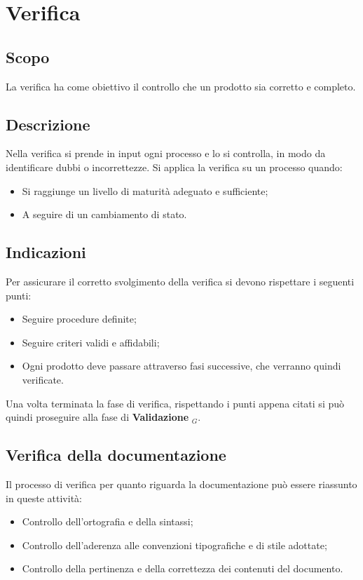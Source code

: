 \section{Verifica}
\subsection{Scopo}
La verifica ha come obiettivo il controllo che un prodotto sia corretto e completo.

\subsection{Descrizione}
Nella verifica si prende in input ogni processo e lo si controlla, in modo da identificare dubbi o incorrettezze.
Si applica la verifica su un processo quando:
\begin{itemize}
  \item Si raggiunge un livello di maturità adeguato e sufficiente;
  \item A seguire di un cambiamento di stato.
\end{itemize}

\subsection{Indicazioni}
Per assicurare il corretto svolgimento della verifica si devono rispettare i seguenti punti:
\begin{itemize}
  \item Seguire procedure definite;
  \item Seguire criteri validi e affidabili;
  \item Ogni prodotto deve passare attraverso fasi successive, che verranno quindi verificate.
\end{itemize}
Una volta terminata la fase di verifica, rispettando i punti appena citati si può quindi proseguire alla fase di \textbf{Validazione} $_G$.

\subsection{Verifica della documentazione}
Il processo di verifica per quanto riguarda la documentazione può essere riassunto in queste attività:
\begin{itemize}
  \item Controllo dell'ortografia e della sintassi;
  \item Controllo dell'aderenza alle convenzioni tipografiche e di stile adottate;
  \item Controllo della pertinenza e della correttezza dei contenuti del documento.
\end{itemize}

